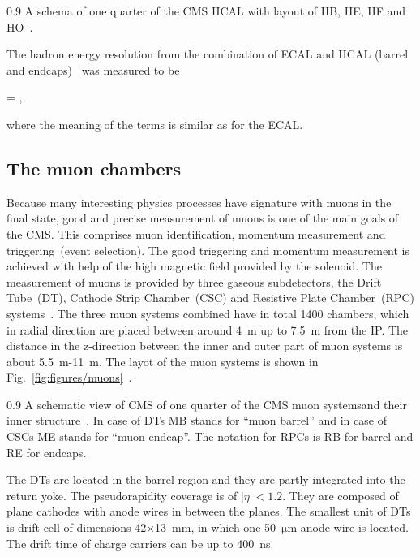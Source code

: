                  {0.9}       
                 {A schema of one quarter of the CMS HCAL with layout of HB, HE, HF and HO~\cite{Chatrchyan:2008aa}. }

The hadron energy resolution from the combination of ECAL and HCAL (barrel and endcaps)~\cite{Chatrchyan:2009ag} was measured to be


{
  =   ,
}

where the meaning of the terms is similar as for the ECAL.

\subsection{The muon chambers}

Because many interesting physics processes have signature with muons in the final state, good and precise measurement of muons is one of the main goals of the CMS. This comprises muon identification, momentum measurement and triggering~(event selection). The good triggering and momentum measurement is achieved with help of the high magnetic field provided by the solenoid. The measurement of muons is provided by three gaseous subdetectors, the Drift Tube~(DT), Cathode Strip Chamber~(CSC) and Resistive Plate Chamber~(RPC) systems~\cite{tdrMuon}. The three muon systems combined have in total 1400 chambers, which in radial direction are placed between around 4~m up to 7.5~m from the IP. The distance in the z-direction between the inner and outer part of muon systems is about 5.5~m-11~m. The layot of the muon systems is shown in Fig.~\ref{fig:figures/muons}~\cite{Chatrchyan:2013sba}.

                 {0.9}       
                 {A schematic view of CMS of one quarter of the CMS muon systemsand their inner structure~\cite{Chatrchyan:2013sba}. In case of DTs MB stands for ``muon barrel'' and in case of CSCs ME stands for ``muon endcap''. The notation for RPCs is RB for barrel and RE for endcaps. }

The DTs are located in the barrel region and they are partly integrated into the return yoke.  The pseudorapidity coverage is of $|\eta|<1.2$. They are composed of plane cathodes with anode wires in between the planes. The smallest unit of DTs is drift cell of dimensions 42$\times$13~mm, in which one 50~$\mathrm{\mu m}$ anode wire is located. The drift time of charge carriers can be up to 400~ns.

